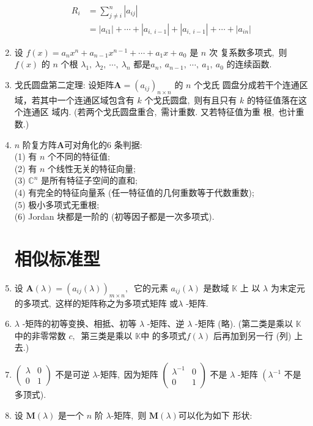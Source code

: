 \begin{enumerate}
		$$\begin{aligned}
			R_{i} &=\sum_{j \neq i}^{n}\left|a_{i j}\right| \\
			&=\left|a_{i 1}\right|+\cdots+\left|a_{i,\  i-1}\right|+\left|a_{i,\  i-1}\right|+\cdots+\left|a_{i n}\right|
		\end{aligned}$$
		
		\item 设 $f(x)=a_{n} x^{n}+a_{n-1} x^{n-1}+\cdots+a_{1} x+a_{0}$  是  $n $ 次 复系数多项式,\  则  $f(x) $ 的 $ n $ 个根 $ \lambda_{1},\  \lambda_{2},\  \cdots,\  \lambda_{n} $ 都是$  a_{n},\  a_{n-1},\  \cdots,\  a_{1},\  a_{0} $ 的连续函数.
		\item 戈氏圆盘第二定理: 设矩阵$  \boldsymbol{A}=\left(a_{i j}\right)_{n \times n}$  的 $ n $ 个戈氏 圆盘分成若干个连通区域，若其中一个连通区域包含有  $k$  个戈氏圆盘,\  则有且只有 $ k$  的特征值落在这个连通区 域内. (若两个戈氏圆盘重合,\  需计重数. 又若特征值为重 根,\  也计重数.)
		\item  $n$  阶复方阵$  \boldsymbol{A}  $可对角化的$ 6$ 条判据:\\
		(1) 有  $n$  个不同的特征值;\\
		(2) 有  $n$  个线性无关的特征向量;\\
		(3) $ \mathbb{C}^{n} $ 是所有特征子空间的直和;\\
		(4) 有完全的特征向量系 (任一特征值的几何重数等于代数重数);\\
		(5) 极小多项式无重根;\\
		(6) Jordan 块都是一阶的 (初等因子都是一次多项式).
		\section{相似标准型}
		\item 设  $\boldsymbol{A}(\lambda)=\left(a_{i j}(\lambda)\right)_{m \times n} ,\ $ 它的元素  $a_{i j}(\lambda) $ 是数域  $\mathbb{K}$  上 以  $\lambda $ 为末定元的多项式,\  这样的矩阵称之为多项式矩阵 或$ \lambda$ -矩阵.
		\item  $\lambda$ -矩阵的初等变换、相抵、初等 $ \lambda$ -矩阵、逆  $\lambda$ -矩阵 (略). (第二类是乘以  $\mathbb{K}$  中的非零常数  $c ,\ $ 第三类是乘以 $ \mathbb{K}  $中 的多项式$  f(\lambda) $ 后再加到另一行 (列) 上去.)
		\item  $\left(\begin{array}{ll}
			\lambda & 0 \\ 
			0 & 1
		\end{array}\right)$  不是可逆  $\lambda $-矩阵,\  因为矩阵  $\left(\begin{array}{cc}
			\lambda^{-1} & 0 \\
			0 & 1
		\end{array}\right) $ 不是 $ \lambda$ -矩阵  $\left(\lambda^{-1}\right.$ 不是多顶式).
		\item 设  $\boldsymbol{M}(\lambda)$  是一个 $ n $ 阶  $\lambda $-矩阵,\  则  $\boldsymbol{M}(\lambda)  $可以化为如下 形状:
		

\end{enumerate}

